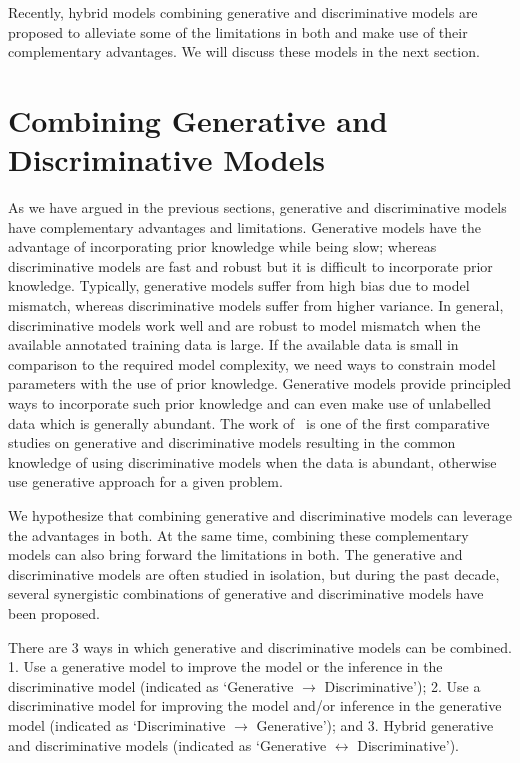 Recently, hybrid models combining generative and discriminative models are proposed
to alleviate some of the limitations in both and make use of their complementary
advantages. We will discuss these models in the next section.

\section{Combining Generative and Discriminative Models}
\label{sec:gen-disc-comb}

As we have argued in the previous sections, generative and discriminative
models have complementary advantages and limitations. Generative models have the
advantage of incorporating prior knowledge while being slow; whereas discriminative
models are fast and robust but it is difficult to incorporate prior knowledge.
Typically, generative models suffer from high bias due to model mismatch, whereas
discriminative models suffer from higher variance.
In general, discriminative models work well and are robust to model
mismatch when the available annotated training data is large. If the
available data is small in comparison to the required model complexity, we need
ways to constrain model parameters with the use of prior knowledge. Generative
models provide principled ways to incorporate such prior knowledge and can even
make use of unlabelled data which is generally abundant.
The work of~\cite{jordan2002discriminative} is one of the first comparative studies on generative and
discriminative models resulting in the common knowledge of using discriminative
models when the data is abundant, otherwise use generative approach for
a given problem.

We hypothesize that combining generative and discriminative
models can leverage the advantages in both. At the same time, combining these complementary
models can also bring forward the limitations in both. The generative and discriminative
models are often studied in isolation, but during the past decade,
several synergistic combinations of generative and discriminative models have been proposed.

There are 3 ways in which generative and discriminative models can be combined.
1. Use a generative model to improve the model or the inference in the discriminative model
(indicated as `Generative $\rightarrow $ Discriminative'); 2. Use a discriminative model for
improving the model and/or inference in the generative model (indicated as
`Discriminative $\rightarrow $ Generative'); and 3. Hybrid generative and discriminative
models (indicated as `Generative $\leftrightarrow $ Discriminative').

